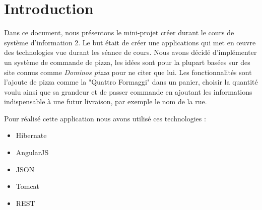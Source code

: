 \section{Introduction}
\setcounter{page}{1}
Dans ce document, nous présentons le mini-projet créer durant le cours de système d'information 2. Le but était de créer une applications qui met en œuvre des technologies vue durant les séance de cours.
Nous avons décidé d'implémenter un système de commande de pizza, les idées sont pour la plupart basées sur des site connus comme \textit{Dominos pizza} pour ne citer que lui. Les fonctionnalités sont l'ajoute de pizza comme la "Quattro Formaggi" dans un panier, choisir la quantité voulu ainsi que sa grandeur et de passer commande en ajoutant les informations indispensable à une futur livraison, par exemple le nom de la rue.

Pour réalisé cette application nous avons utilisé ces technologies :
\begin{itemize}
\item Hibernate
\item AngularJS
\item JSON
\item Tomcat
\item REST
\end{itemize}